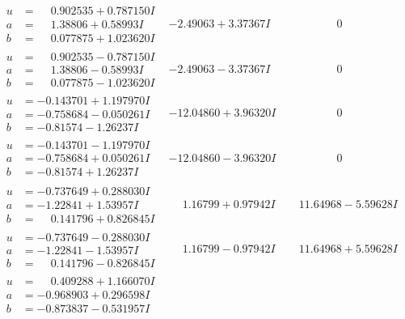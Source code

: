 \documentclass[1p]{elsarticle_modified}
\theoremstyle{definition}
\begin{document}
$$\begin{array}{c|c|c}
\begin{aligned}
u &= \phantom{-}0.902535 + 0.787150 I \\
a &= \phantom{-}1.38806 + 0.58993 I \\
b &= \phantom{-}0.077875 + 1.023620 I\end{aligned}
 & -2.49063 + 3.37367 I & \phantom{-0.000000 } 0 \\ \hline\begin{aligned}
u &= \phantom{-}0.902535 - 0.787150 I \\
a &= \phantom{-}1.38806 - 0.58993 I \\
b &= \phantom{-}0.077875 - 1.023620 I\end{aligned}
 & -2.49063 - 3.37367 I & \phantom{-0.000000 } 0 \\ \hline\begin{aligned}
u &= -0.143701 + 1.197970 I \\
a &= -0.758684 - 0.050261 I \\
b &= -0.81574 - 1.26237 I\end{aligned}
 & -12.04860 + 3.96320 I & \phantom{-0.000000 } 0 \\ \hline\begin{aligned}
u &= -0.143701 - 1.197970 I \\
a &= -0.758684 + 0.050261 I \\
b &= -0.81574 + 1.26237 I\end{aligned}
 & -12.04860 - 3.96320 I & \phantom{-0.000000 } 0 \\ \hline\begin{aligned}
u &= -0.737649 + 0.288030 I \\
a &= -1.22841 + 1.53957 I \\
b &= \phantom{-}0.141796 + 0.826845 I\end{aligned}
 & \phantom{-}1.16799 + 0.97942 I & \phantom{-}11.64968 - 5.59628 I \\ \hline\begin{aligned}
u &= -0.737649 - 0.288030 I \\
a &= -1.22841 - 1.53957 I \\
b &= \phantom{-}0.141796 - 0.826845 I\end{aligned}
 & \phantom{-}1.16799 - 0.97942 I & \phantom{-}11.64968 + 5.59628 I \\ \hline\begin{aligned}
u &= \phantom{-}0.409288 + 1.166070 I \\
a &= -0.968903 + 0.296598 I \\
b &= -0.873837 - 0.531957 I\end{aligned}

\end{array}$$
\end{document}
